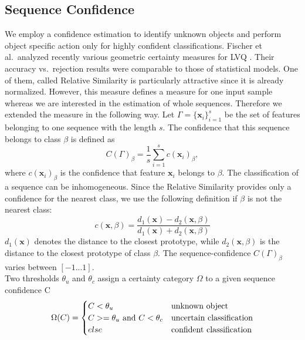 \documentclass[conference]{IEEEtran}
\begin{document}
\subsection{Sequence Confidence}\label{classification}
We employ a confidence estimation to identify unknown objects and perform object specific action only for highly confident classifications.
Fischer et al.\ analyzed recently various geometric certainty measures for LVQ \cite{2673548}. Their accuracy vs.\ rejection results 
were comparable to those of statistical models. One of them, called Relative Similarity is particularly attractive since it is 
already normalized. However, this measure defines a measure for one input sample whereas we are interested in the estimation of whole sequences. Therefore we
extended the measure in the following way.
Let $\Gamma= \{\mathbf{x}_i\}_{i=1}^s$ be the set of features belonging to one sequence with the length $s$. The confidence that this sequence belongs to class $\beta$ is defined as
\begin{equation*} 
C(\Gamma)_\beta = \frac{1}{s}\sum_{i=1}^sc(\mathbf{x}_i)_\beta,
\end{equation*}
where $c(\mathbf{x}_i)_\beta$ is the confidence that feature $\mathbf{x}_i$ belongs to $\beta$.
The classification of a sequence can be inhomogeneous. 
Since the Relative Similarity provides only a confidence for the nearest class, we use the following definition if 
$\beta$ is not the nearest class:
\begin{equation*}
c(\mathbf{x},\beta) = \frac{d_1(\mathbf{x}) - d_2(\mathbf{x},\beta)}{d_1(\mathbf{x})+d_2(\mathbf{x},\beta)}
\end{equation*}
$d_1(\mathbf{x})$ denotes the distance to the closest prototype, while $d_2(\mathbf{x},\beta)$ is the distance to the closest prototype of class $\beta$.
The sequence-confidence $C(\Gamma)_\beta$ varies between $[-1...1]$.\\
Two thresholds $\theta_{u}$ and $\theta_{c}$ assign a certainty category $\Omega$ to a given sequence confidence C
\begin{equation*} 
\Omega(C) = \begin{cases}C < \theta_{u} & $unknown object$ \\ C >= \theta_{u} $ and $C< \theta_{c} & $uncertain classification$ \\ else & $confident classification$ \end{cases}
\end{equation*}
\end{document}
